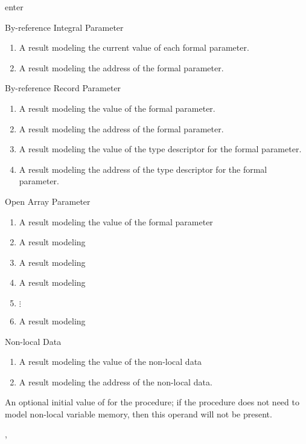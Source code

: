\begin{instruction}{enter}
\begin{results}
  \item By-reference Integral Parameter
    \begin{enumerate}
    \item A result modeling the current value of each \byref formal
      parameter.
    \item A result modeling the address of the formal parameter.
    \end{enumerate}

  \item By-reference Record Parameter
    \begin{enumerate}
    \item A result modeling the value of the formal parameter.
    \item A result modeling the address of the formal parameter.
    \item A result modeling the value of the type descriptor for the
      formal parameter.
    \item A result modeling the address of the type descriptor for the
      formal parameter.
    \end{enumerate}

  \item Open Array Parameter
    \begin{enumerate}
    \item A result modeling the value of the formal parameter
    \item A result modeling 
    \item A result modeling 
    \item A result modeling 
    \item $\vdots$
    \item A result modeling 
    \end{enumerate}

  \item Non-local Data
    \begin{enumerate}
    \item A result modeling the value of the non-local data
    \item A result modeling the address of the non-local data.
    \end{enumerate}
  \end{results}

  \begin{operands}
  \item An optional initial value of  for the procedure;
    if the procedure does not need to model non-local variable memory,
    then this operand will not be present.
  \end{operands}

  \begin{seealso}
    , 
  \end{seealso}
\end{instruction}

